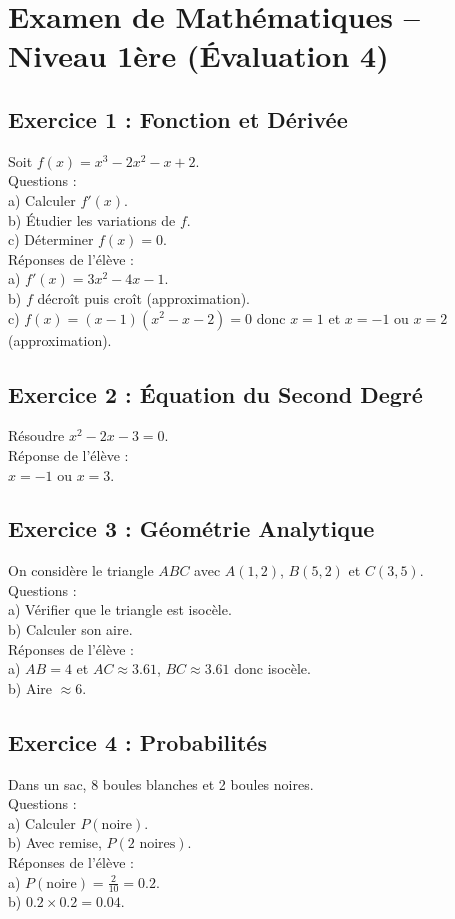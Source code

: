 \documentclass{article}
\begin{document}
\section*{Examen de Mathématiques – Niveau 1ère (Évaluation 4)}

\subsection*{Exercice 1 : Fonction et Dérivée}
Soit $f(x) = x^3 - 2x^2 - x + 2$.\\
Questions :\\
a) Calculer $f'(x)$.\\
b) Étudier les variations de $f$.\\
c) Déterminer $f(x) = 0$.\\

Réponses de l’élève :\\
a) $f'(x) = 3x^2 - 4x - 1$.\\
b) $f$ décroît puis croît (approximation).\\
c) $f(x) = (x - 1)(x^2 - x - 2) = 0$ donc $x = 1$ et $x = -1$ ou $x = 2$ (approximation).\\

\subsection*{Exercice 2 : Équation du Second Degré}
Résoudre $x^2 - 2x - 3 = 0$.\\
Réponse de l’élève :\\
$x = -1$ ou $x = 3$.\\

\subsection*{Exercice 3 : Géométrie Analytique}
On considère le triangle $ABC$ avec $A(1, 2)$, $B(5, 2)$ et $C(3, 5)$.\\
Questions :\\
a) Vérifier que le triangle est isocèle.\\
b) Calculer son aire.\\

Réponses de l’élève :\\
a) $AB = 4$ et $AC \approx 3.61$, $BC \approx 3.61$ donc isocèle.\\
b) Aire $\approx 6$.\\

\subsection*{Exercice 4 : Probabilités}
Dans un sac, 8 boules blanches et 2 boules noires.\\
Questions :\\
a) Calculer $P(\text{noire})$.\\
b) Avec remise, $P(2 \text{ noires})$.\\

Réponses de l’élève :\\
a) $P(\text{noire}) = \frac{2}{10} = 0.2$.\\
b) $0.2 \times 0.2 = 0.04$.
\end{document}
